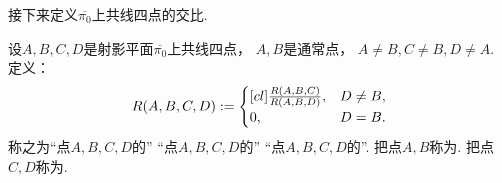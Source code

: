 接下来定义\(\overline{\pi_0}\)上共线四点的交比.
\begin{definition}%
设\(A,B,C,D\)是射影平面\(\overline{\pi_0}\)上共线四点，
\(A,B\)是通常点，
\(
	A \neq B,
	C \neq B,
	D \neq A
\).
定义：\begin{equation*}
	R(A,B,C,D)
	:=
	\begin{cases}[cl]
		\frac{R(A,B,C)}{R(A,B,D)},	& D \neq B, \\
		0,							& D = B.
	\end{cases}
\end{equation*}
称之为“点\(A,B,C,D\)的”
“点\(A,B,C,D\)的”
“点\(A,B,C,D\)的”.
把点\(A,B\)称为.
把点\(C,D\)称为.
\end{definition}


